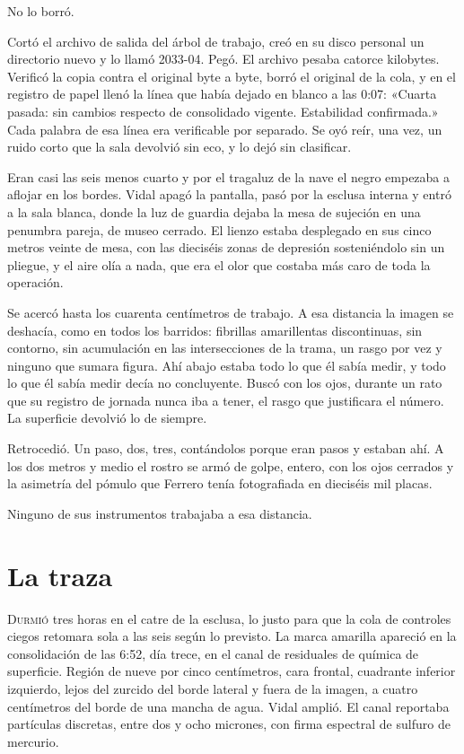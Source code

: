 No lo borró.

Cortó el archivo de salida del árbol de trabajo, creó en su disco personal un directorio nuevo y lo llamó 2033-04. Pegó. El archivo pesaba catorce kilobytes. Verificó la copia contra el original byte a byte, borró el original de la cola, y en el registro de papel llenó la línea que había dejado en blanco a las 0:07: «Cuarta pasada: sin cambios respecto de consolidado vigente. Estabilidad confirmada.» Cada palabra de esa línea era verificable por separado. Se oyó reír, una vez, un ruido corto que la sala devolvió sin eco, y lo dejó sin clasificar.

Eran casi las seis menos cuarto y por el tragaluz de la nave el negro empezaba a aflojar en los bordes. Vidal apagó la pantalla, pasó por la esclusa interna y entró a la sala blanca, donde la luz de guardia dejaba la mesa de sujeción en una penumbra pareja, de museo cerrado. El lienzo estaba desplegado en sus cinco metros veinte de mesa, con las dieciséis zonas de depresión sosteniéndolo sin un pliegue, y el aire olía a nada, que era el olor que costaba más caro de toda la operación.

Se acercó hasta los cuarenta centímetros de trabajo. A esa distancia la imagen se deshacía, como en todos los barridos: fibrillas amarillentas discontinuas, sin contorno, sin acumulación en las intersecciones de la trama, un rasgo por vez y ninguno que sumara figura. Ahí abajo estaba todo lo que él sabía medir, y todo lo que él sabía medir decía no concluyente. Buscó con los ojos, durante un rato que su registro de jornada nunca iba a tener, el rasgo que justificara el número. La superficie devolvió lo de siempre.

Retrocedió. Un paso, dos, tres, contándolos porque eran pasos y estaban ahí. A los dos metros y medio el rostro se armó de golpe, entero, con los ojos cerrados y la asimetría del pómulo que Ferrero tenía fotografiada en dieciséis mil placas.

Ninguno de sus instrumentos trabajaba a esa distancia.

\clearpage

\chapter{La traza}

\lettrine[lines=2, lhang=0.1, nindent=0.2em]{D}{urmió} tres horas en el catre de la esclusa, lo justo para que la cola de controles ciegos retomara sola a las seis según lo previsto. La marca amarilla apareció en la consolidación de las 6:52, día trece, en el canal de residuales de química de superficie. Región de nueve por cinco centímetros, cara frontal, cuadrante inferior izquierdo, lejos del zurcido del borde lateral y fuera de la imagen, a cuatro centímetros del borde de una mancha de agua. Vidal amplió. El canal reportaba partículas discretas, entre dos y ocho micrones, con firma espectral de sulfuro de mercurio.


